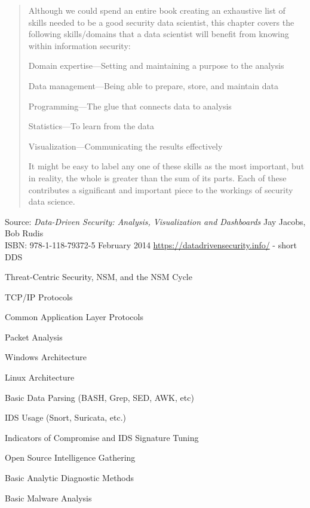 \documentclass[Screen16to9,17pt]{foils}
\begin{document}

\begin{quote}
Although we could spend an entire book creating an exhaustive list of skills needed to be a good security data scientist, this chapter covers the following skills/domains that a data scientist will benefit from
knowing within information security:
\begin{list2}
\item Domain expertise—Setting and maintaining a purpose to the analysis
\item Data management—Being able to prepare, store, and maintain data
\item Programming—The glue that connects data to analysis
\item Statistics—To learn from the data
\item Visualization—Communicating the results effectively
\end{list2}
It might be easy to label any one of these skills as the most important, but in reality, the whole is greater than the sum of its parts. Each of these contributes a significant and important piece to the workings of
security data science.
\end{quote}

Source: \emph{Data-Driven Security: Analysis, Visualization and Dashboards} Jay Jacobs, Bob Rudis\\
ISBN: 978-1-118-79372-5 February 2014 \url{https://datadrivensecurity.info/} - short DDS




\begin{list2}\small
\item Threat-Centric Security, NSM, and the NSM Cycle
\item TCP/IP Protocols
\item Common Application Layer Protocols
\item Packet Analysis
\item Windows Architecture
\item Linux Architecture
\item Basic Data Parsing (BASH, Grep, SED, AWK, etc)
\item IDS Usage (Snort, Suricata, etc.)
\item Indicators of Compromise and IDS Signature Tuning
\item Open Source Intelligence Gathering
\item Basic Analytic Diagnostic Methods
\item Basic Malware Analysis
\end{list2}
\end{document}

